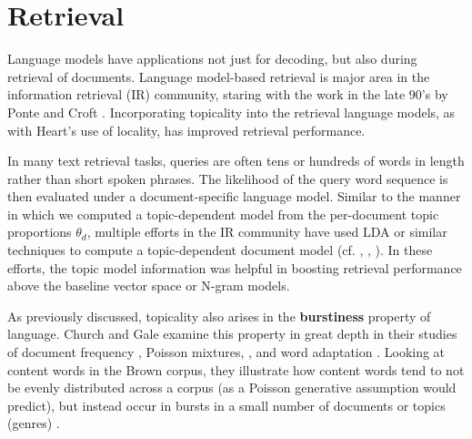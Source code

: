         

\section{Retrieval}

Language models have applications not just for decoding, but also during retrieval of documents.  Language model-based retrieval is major area in the information retrieval (IR) community, staring with the work in the late 90's by Ponte and Croft \cite{ponte1998}.  Incorporating topicality into the retrieval language models, as with Heart's use of locality, has improved retrieval performance.  

In many text retrieval tasks, queries are often tens or hundreds of words in length rather than short spoken phrases.  The likelihood of the query word sequence is then evaluated under a document-specific language model.   Similar to the manner in which we computed a topic-dependent model from the per-document topic proportions $\theta_d$, multiple efforts in the IR community have used LDA or similar techniques to compute a topic-dependent document model  (cf. \cite{wei2006lda}, \cite{chen2009}, \cite{liu2004cluster}).  In these efforts, the topic model information was helpful in boosting retrieval performance above the baseline vector space or N-gram models.


As previously discussed, topicality also arises in the \textbf{burstiness} property of language.   Church and Gale examine this property in great depth in their studies of document frequency \cite{church1999}, Poisson mixtures, \cite{church1995poisson}, and word adaptation \cite{church2000}.   Looking at content words in the Brown corpus, they illustrate how content words tend to not be evenly distributed across a corpus (as a Poisson generative assumption would predict), but instead occur in bursts in a small number of documents or topics (genres) \cite{church1995poisson}.  

